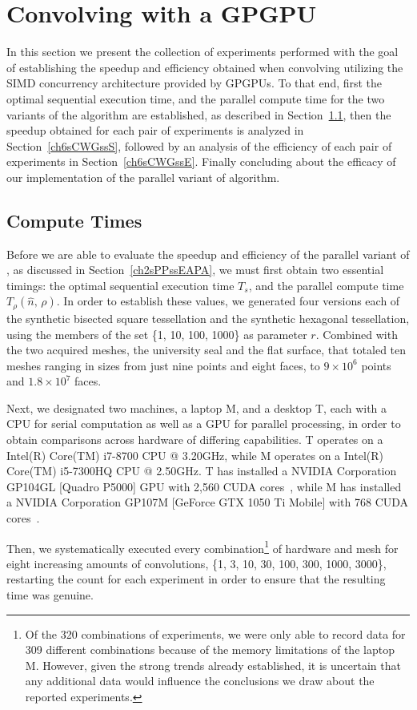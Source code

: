 \section{Convolving with a GPGPU}
\label{ch6sCWG}
In this section we present the collection of experiments performed with the goal of establishing the speedup and efficiency obtained when convolving  utilizing the \gls{SIMD} concurrency architecture provided by \glspl{GPGPU}. To that end, first the optimal sequential execution time, and the parallel compute time for the two variants of the  algorithm are established, as described in Section~\ref{ch6sCWGssCT}, then the speedup obtained for each pair of experiments is analyzed in Section~\ref{ch6sCWGssS}, followed by an analysis of the efficiency of each pair of experiments in Section~\ref{ch6sCWGssE}. Finally concluding about the efficacy of our implementation of the parallel variant of  algorithm.

%
%
%
%
\subsection{Compute Times}
\label{ch6sCWGssCT}
Before we are able to evaluate the \gls{speedup} and \gls{efficiency} of the parallel variant of , as discussed in Section~\ref{ch2sPPssEAPA}, we must first obtain two essential timings: the optimal sequential execution time $\mathit{T_s}$, and the parallel compute time $\mathit{T_{\rho}}(\hat{n},\,\rho)$. In order to establish these values, we generated four versions each of the synthetic bisected square tessellation and the synthetic hexagonal tessellation, using the members of the set \{1, 10, 100, 1000\} as parameter $r$. Combined with the two acquired meshes, the university seal and the flat surface, that totaled ten meshes ranging in sizes from just nine points and eight faces, to $9\times 10^6$ points and $1.8\times 10^7$ faces.

Next, we designated two machines, a laptop M, and a desktop T, each with a CPU for serial computation as well as a GPU for parallel processing, in order to obtain comparisons across hardware of differing capabilities. T operates on a Intel(R) Core(TM) i7-8700 CPU @ 3.20GHz, while M operates on a Intel(R) Core(TM) i5-7300HQ CPU @ 2.50GHz. T has installed a NVIDIA Corporation GP104GL [Quadro P5000] GPU with 2,560 CUDA cores~\cite{quadro5k}, while M has installed a NVIDIA Corporation GP107M [GeForce GTX 1050 Ti Mobile] with 768 CUDA cores~\cite{geforce1050}.

Then, we systematically executed every combination\footnote{Of the 320 combinations of experiments, we were only able to record data for 309 different combinations because of the memory limitations of the laptop M. However, given the strong trends already established, it is uncertain that any additional data would influence the conclusions we draw about the reported experiments.} of hardware and mesh for eight increasing amounts of convolutions, \{1, 3, 10, 30, 100, 300, 1000, 3000\}, restarting the count for each experiment in order to ensure that the resulting time was genuine.

